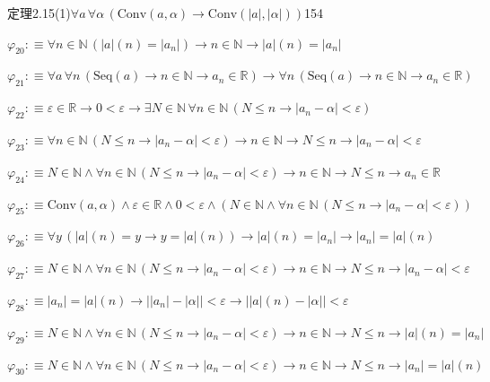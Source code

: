 \begin{fullproof}{定理2.15(1)}{$\forall a\,\forall \alpha\,(\mathrm{Conv}(a,\alpha) \to \mathrm{Conv}(\lvert a \rvert,\lvert \alpha \rvert))$}{154}
\begin{abbrevlist}
\item $\varphi_{20} :\equiv \forall n \in \mathbb{N}\,(\lvert a \rvert(n) = \lvert a_{n} \rvert) \to n \in \mathbb{N} \to \lvert a \rvert(n) = \lvert a_{n} \rvert$
\item $\varphi_{21} :\equiv \forall a\,\forall n\,(\mathrm{Seq}(a) \to n \in \mathbb{N} \to a_{n} \in \mathbb{R}) \to \forall n\,(\mathrm{Seq}(a) \to n \in \mathbb{N} \to a_{n} \in \mathbb{R})$
\item $\varphi_{22} :\equiv \varepsilon \in \mathbb{R} \to 0 < \varepsilon \to \exists N \in \mathbb{N}\,\forall n \in \mathbb{N}\,(N \leq n \to \lvert a_{n} - \alpha \rvert < \varepsilon)$
\item $\varphi_{23} :\equiv \forall n \in \mathbb{N}\,(N \leq n \to \lvert a_{n} - \alpha \rvert < \varepsilon) \to n \in \mathbb{N} \to N \leq n \to \lvert a_{n} - \alpha \rvert < \varepsilon$
\item $\varphi_{24} :\equiv N \in \mathbb{N} \land \forall n \in \mathbb{N}\,(N \leq n \to \lvert a_{n} - \alpha \rvert < \varepsilon) \to n \in \mathbb{N} \to N \leq n \to a_{n} \in \mathbb{R}$
\item $\varphi_{25} :\equiv \mathrm{Conv}(a,\alpha) \land \varepsilon \in \mathbb{R} \land 0 < \varepsilon \land (N \in \mathbb{N} \land \forall n \in \mathbb{N}\,(N \leq n \to \lvert a_{n} - \alpha \rvert < \varepsilon))$
\item $\varphi_{26} :\equiv \forall y\,(\lvert a \rvert(n) = y \to y = \lvert a \rvert(n)) \to \lvert a \rvert(n) = \lvert a_{n} \rvert \to \lvert a_{n} \rvert = \lvert a \rvert(n)$
\item $\varphi_{27} :\equiv N \in \mathbb{N} \land \forall n \in \mathbb{N}\,(N \leq n \to \lvert a_{n} - \alpha \rvert < \varepsilon) \to n \in \mathbb{N} \to N \leq n \to \lvert a_{n} - \alpha \rvert < \varepsilon$
\item $\varphi_{28} :\equiv \lvert a_{n} \rvert = \lvert a \rvert(n) \to \lvert \lvert a_{n} \rvert - \lvert \alpha \rvert \rvert < \varepsilon \to \lvert \lvert a \rvert(n) - \lvert \alpha \rvert \rvert < \varepsilon$
\item $\varphi_{29} :\equiv N \in \mathbb{N} \land \forall n \in \mathbb{N}\,(N \leq n \to \lvert a_{n} - \alpha \rvert < \varepsilon) \to n \in \mathbb{N} \to N \leq n \to \lvert a \rvert(n) = \lvert a_{n} \rvert$
\item $\varphi_{30} :\equiv N \in \mathbb{N} \land \forall n \in \mathbb{N}\,(N \leq n \to \lvert a_{n} - \alpha \rvert < \varepsilon) \to n \in \mathbb{N} \to N \leq n \to \lvert a_{n} \rvert = \lvert a \rvert(n)$

\end{abbrevlist}
\end{fullproof}
